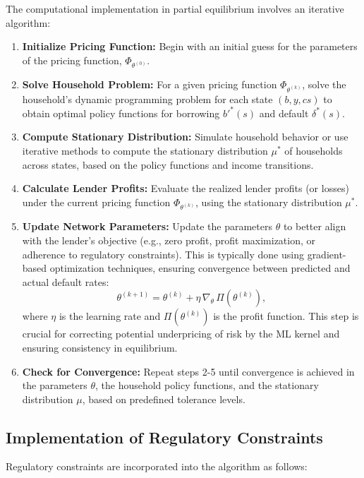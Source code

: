 \documentclass[acmsmall]{acmart}
\begin{document}
The computational implementation in partial equilibrium involves an iterative algorithm:
\begin{enumerate}
    \item \textbf{Initialize Pricing Function:} Begin with an initial guess for the parameters of the pricing function, $\Phi_{\theta^{(0)}}$.
    \item \textbf{Solve Household Problem:} For a given pricing function $\Phi_{\theta^{(k)}}$, solve the household's dynamic programming problem for each state $(b,y,cs)$ to obtain optimal policy functions for borrowing $b'^{*}(s)$ and default $\delta^{*}(s)$.
    \item \textbf{Compute Stationary Distribution:} Simulate household behavior or use iterative methods to compute the stationary distribution $\mu^{*}$ of households across states, based on the policy functions and income transitions.
    \item \textbf{Calculate Lender Profits:} Evaluate the realized lender profits (or losses) under the current pricing function $\Phi_{\theta^{(k)}}$, using the stationary distribution $\mu^{*}$.
    \item \textbf{Update Network Parameters:} Update the parameters $\theta$ to better align with the lender's objective (e.g., zero profit, profit maximization, or adherence to regulatory constraints). This is typically done using gradient-based optimization techniques, ensuring convergence between predicted and actual default rates:
    \begin{equation}
        \theta^{(k+1)} = \theta^{(k)} + \eta \, \nabla_{\theta} \, \Pi(\theta^{(k)}),
    \end{equation}
    where $\eta$ is the learning rate and $\Pi(\theta^{(k)})$ is the profit function. This step is crucial for correcting potential underpricing of risk by the ML kernel and ensuring consistency in equilibrium.
    \item \textbf{Check for Convergence:} Repeat steps 2-5 until convergence is achieved in the parameters $\theta$, the household policy functions, and the stationary distribution $\mu$, based on predefined tolerance levels.
\end{enumerate}

\subsection*{Implementation of Regulatory Constraints}

Regulatory constraints are incorporated into the algorithm as follows:
\end{document}
